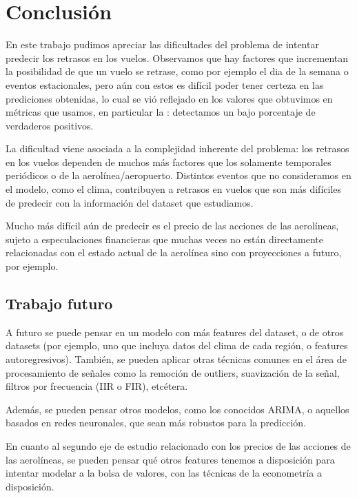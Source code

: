 \section{Conclusi\'on}
En este trabajo pudimos apreciar las dificultades del problema de intentar predecir los
retrasos en los vuelos.
Observamos que hay factores que incrementan la posibilidad de que un vuelo se retrase,
como por ejemplo el dia de la semana o eventos estacionales, pero a\'un con estos es
dif\'icil poder tener certeza en las prediciones obtenidas, lo cual se vi\'o reflejado en
los valores que obtuvimos en m\'etricas que usamos, en particular la : detectamos
un bajo porcentaje de verdaderos positivos.

La dificultad viene asociada a la complejidad inherente del problema: los retrasos en los vuelos dependen
de muchos m\'as factores que los solamente temporales peri\'odicos o de la aerol\'inea/aeropuerto. Distintos
eventos que no consideramos en el modelo, como el clima, contribuyen a retrasos en vuelos que son m\'as
dif\'iciles de predecir con la informaci\'on del dataset que estudiamos.

Mucho m\'as dif\'icil a\'un de predecir es el precio de las acciones de las aerol\'ineas, sujeto a
especulaciones financieras que muchas veces no est\'an directamente relacionadas con el estado
actual de la aerol\'inea sino con proyecciones a futuro, por ejemplo.

\subsection{Trabajo futuro}\label{sec:futurework}
A futuro se puede pensar en un modelo con m\'as features del dataset, o de otros datasets (por ejemplo,
uno que incluya datos del clima de cada regi\'on, o features autoregresivos).
Tambi\'en, se pueden aplicar otras t\'ecnicas comunes
en el \'area de procesamiento de se\~nales como la remoci\'on de outliers, suavizaci\'on de la se\~nal,
filtros por frecuencia (IIR o FIR), etc\'etera.

Adem\'as, se pueden pensar otros modelos, como los conocidos ARIMA, o aquellos basados en redes neuronales,
que sean m\'as robustos para la predicci\'on.

En cuanto al segundo eje de estudio relacionado con los precios de las acciones de las aerol\'ineas, se pueden
pensar qu\'e otros features tenemos a disposici\'on para intentar modelar a la bolsa de valores,
con las t\'ecnicas de la econometr\'ia a disposici\'on.

